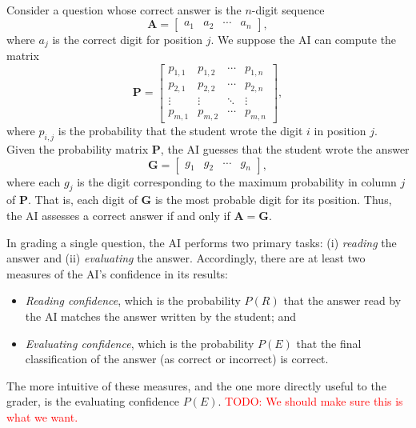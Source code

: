 \documentclass{article}
\begin{document}
Consider a question whose correct answer is the $n$-digit sequence
\begin{equation}
    \mathbf{A} =
    \begin{bmatrix}
        a_1 & a_2 & \cdots & a_n
    \end{bmatrix},
\end{equation}
where $a_j$ is the correct digit for position $j$.  We suppose the
AI can compute the matrix
\begin{equation*}
    \mathbf{P} =
    \begin{bmatrix}
        p_{1,1} & p_{1,2} & \cdots & p_{1,n}
        \\
        p_{2,1} & p_{2,2} & \cdots & p_{2,n}
        \\
        \vdots & \vdots & \ddots & \vdots
        \\
        p_{m,1} & p_{m,2} & \cdots & p_{m,n}
    \end{bmatrix},
\end{equation*}
where $p_{i,j}$ is the probability that the student wrote the digit
$i$ in position $j$.  Given the probability matrix $\mathbf{P}$, the AI
guesses that the student wrote the answer
\begin{equation*}
    \mathbf{G} =
    \begin{bmatrix}
        g_1 & g_2 & \cdots & g_n
    \end{bmatrix},
\end{equation*}
where each $g_j$ is the digit corresponding to the maximum probability
in column $j$ of $\mathbf{P}$.  That is, each digit of $\mathbf{G}$ is the most
probable digit for its position.  Thus, the AI assesses a correct answer
if and only if $\mathbf{A} = \mathbf{G}$.

In grading a single question, the AI performs two primary tasks:
(i) \emph{reading} the answer and (ii) \emph{evaluating} the answer.
Accordingly, there are at least two measures of the AI's
confidence in its results:
\begin{itemize}
    \item \emph{Reading confidence}, which is the probability $P(R)$ that the
        answer read by the AI matches the answer written by the
        student; and
    \item \emph{Evaluating confidence}, which is the probability $P(E)$ that
        the final classification of the answer (as correct or
        incorrect) is correct.
\end{itemize}
The more intuitive of these measures, and the one more directly useful
to the grader, is the evaluating confidence $P(E)$. \textcolor{red}{TODO:
We should make sure this is what we want.}
\end{document}
